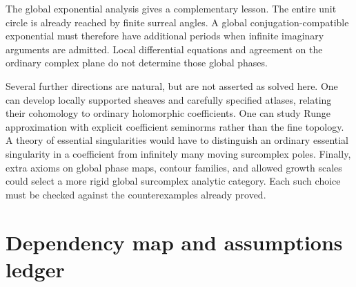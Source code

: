 \documentclass[11pt,letterpaper]{article}
\numberwithin{equation}{section}
\theoremstyle{definition}
\theoremstyle{remark}
\begin{document}
The global exponential analysis gives a complementary lesson. The entire
unit circle is already reached by finite surreal angles. A global
conjugation-compatible exponential must therefore have additional periods
when infinite imaginary arguments are admitted. Local differential equations
and agreement on the ordinary complex plane do not determine those global
phases.

Several further directions are natural, but are not asserted as solved here.
One can develop locally supported sheaves and carefully specified atlases,
relating their cohomology to ordinary holomorphic coefficients. One can study
Runge approximation with explicit coefficient seminorms rather than the fine
topology. A theory of essential singularities would have to distinguish an
ordinary essential singularity in a coefficient from infinitely many moving
surcomplex poles. Finally, extra axioms on global phase maps, contour
families, and allowed growth scales could select a more rigid global
surcomplex analytic category. Each such choice must be checked against the
counterexamples already proved.

\appendix
\section{Dependency map and assumptions ledger}\label{app:ledger}
\end{document}
